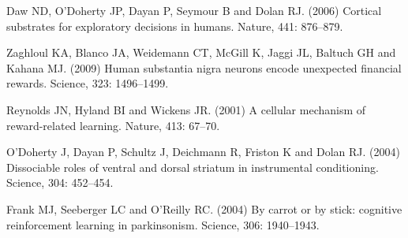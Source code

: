 \documentclass[11pt,a4paper]{scrartcl}
\begin{document}



\begin{thebibliography}{10}

Daw ND, O'Doherty JP, Dayan P, Seymour B and Dolan RJ. (2006) Cortical substrates for exploratory decisions in humans. 
\newblock Nature, 441: 876--879.

Zaghloul KA, Blanco JA, Weidemann CT, McGill K, Jaggi JL, Baltuch GH and Kahana MJ. (2009) Human substantia nigra neurons encode unexpected financial rewards. 
\newblock Science, 323: 1496--1499.

Reynolds JN, Hyland BI and Wickens JR. (2001) A cellular mechanism of reward-related learning. 
\newblock Nature, 413: 67--70.

O'Doherty J, Dayan P, Schultz J, Deichmann R, Friston K and Dolan RJ. (2004) Dissociable roles of ventral and dorsal striatum in instrumental conditioning. 
\newblock Science, 304: 452--454.

Frank MJ, Seeberger LC and O'Reilly RC. (2004) By carrot or by stick: cognitive reinforcement learning in parkinsonism. 
\newblock Science, 306: 1940--1943.

\end{thebibliography}
\end{document}
